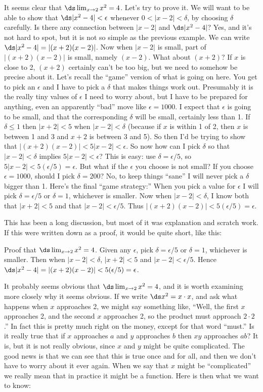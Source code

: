 \begin{example}
It seems clear that $\ds \lim_{x\to 2} x^2=4$. Let's try to prove it. We
will want to be able to show that $\ds |x^2-4|<\epsilon$ whenever 
$0<|x-2|<\delta$, by choosing $\delta$ carefully. Is there any
connection between $|x-2|$ and $\ds |x^2-4|$? Yes, and it's not hard to
spot, but it is not so simple as the previous example. We can write
$\ds |x^2-4|=|(x+2)(x-2)|$. Now when $|x-2|$ is small, part of 
$|(x+2)(x-2)|$ is small, namely $(x-2)$. What about $(x+2)$? If $x$ is
close to 2, $(x+2)$ certainly can't be too big, but we need to somehow
be precise about it. Let's recall the ``game'' version of what is
going on here. You get to pick an $\epsilon$ and I have to pick a
$\delta$ that makes things work out. Presumably it is the really tiny
values of $\epsilon$ I need to worry about, but I have to be prepared
for anything, even an apparently ``bad'' move like $\epsilon=1000$.
I expect that $\epsilon$ is going to be small, and that the
corresponding $\delta$ will be small, certainly less than 1.
If $\delta\le 1$ then
$|x+2|<5$ when $|x-2|<\delta$ (because if $x$ is
within 1 of 2, then $x$ is between 1 and 3 and $x+2$ is between 3 and
5). So then I'd be trying to show that
$|(x+2)(x-2)|<5|x-2|<\epsilon$. So now how can I pick $\delta$ so that 
$|x-2|<\delta$ implies $5|x-2|<\epsilon$? This is easy: use
$\delta=\epsilon/5$, so $5|x-2|<5(\epsilon/5) = \epsilon$. But what if
the $\epsilon$ you choose is not small? If you choose
$\epsilon=1000$, should I pick $\delta=200$? No, to keep things
``sane'' I will never pick a $\delta$ bigger than 1. Here's the final
``game strategy:'' When you pick a value for $\epsilon$ I will pick
$\delta=\epsilon/5$ or $\delta=1$, whichever is smaller. Now when 
$|x-2|<\delta$, I know both that $|x+2|<5$ and that
$|x-2|<\epsilon/5$. Thus $|(x+2)(x-2)|<5(\epsilon/5) = \epsilon$.

This has been a long discussion, but most of it was explanation and
scratch work. If this were written down as a proof, it would be quite
short, like this:

Proof that $\ds \lim_{x\to 2}x^2=4$. Given any $\epsilon$, pick
$\delta=\epsilon/5$ or $\delta=1$, whichever is smaller. Then when
$|x-2|<\delta$, $|x+2|<5$ and
$|x-2|<\epsilon/5$. Hence $\ds |x^2-4|=|(x+2)(x-2)|<5(\epsilon/5) =
\epsilon$. 
\end{example}

It probably seems obvious that $\ds \lim_{x\to2}x^2=4$, and it is worth
examining more closely why it seems obvious. If we write $\ds x^2=x\cdot
x$, and ask what happens when $x$ approaches 2, we might say something
like, ``Well, the first $x$ approaches 2, and the second $x$
approaches 2, so the product must approach $2\cdot2$.'' In fact this is
pretty much right on the money, except for that word ``must.'' Is it
really true that if $x$ approaches $a$ and $y$ approaches $b$ then
$xy$ approaches $ab$? It is, but it is not really obvious, since $x$
and $y$ might be quite complicated. The good news is that we can see
that this is true once and for all, and then we don't have to worry
about it ever again. When we say that $x$ might be ``complicated'' we
really mean that in practice it might be a function. Here is then what
we want to know:

